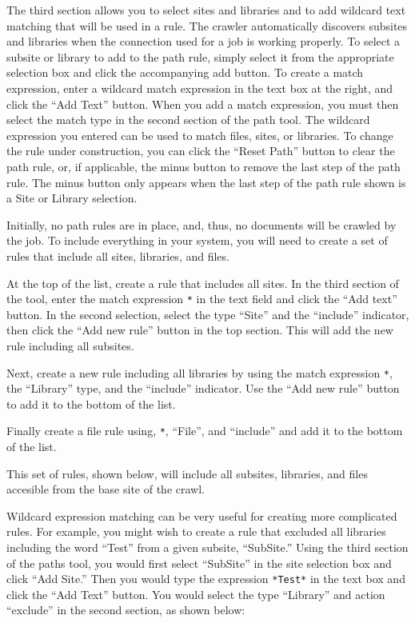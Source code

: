\begin{itemize}
The third section allows you to select sites and libraries and to add
wildcard text matching that will be used in a rule. The
crawler automatically discovers subsites and libraries when the
connection used for a job is working properly. To select a subsite or library
to add to the path rule, simply select it from the appropriate
selection box and click the accompanying add button. To create a match
expression, enter a wildcard match expression in the text box at the
right, and click the ``Add Text'' button. When you add a match
expression, you must then select the match type in the second section
of the path tool. The wildcard expression you entered can be used to
match files, sites, or libraries. To change the rule under
construction, you can click the ``Reset Path'' button to clear the
path rule, or, if applicable, the minus button to remove the last step
of the path rule. The minus button only appears when the last step of
the path rule shown is a Site or Library selection.


\end{itemize}


Initially, no path rules are in place, and, thus, no documents will be
crawled by the job. To include everything in your system, you will need to create a set of rules that include all sites, libraries, and files.

At the top of the list, create a rule that includes all sites. In the
third section of the tool, enter the match expression \texttt{*} in
the text field and click the ``Add text'' button. In the second
selection, select the type ``Site'' and the ``include'' indicator,
then click the ``Add new rule'' button in the top section. This will
add the new rule including all subsites.

Next, create a new rule including all libraries by using the match
expression \texttt{*}, the ``Library'' type, and the ``include''
indicator. Use the ``Add new rule'' button to add it to the bottom of
the list.

Finally create a file rule using, \texttt{*}, ``File'', and
``include'' and add it to the bottom of the list.

This set of rules, shown below, will include all subsites, libraries, and files
accesible from the base site of the crawl.


Wildcard expression matching can be very useful for creating more
complicated rules. For example, you might wish to create a rule that
excluded all libraries including the word ``Test'' from a
given subsite, ``SubSite.'' Using the third section of the paths
tool, you would first select ``SubSite'' in the site selection box
and click ``Add Site.'' Then you would type the expression
\texttt{*Test*} in the text box and click the ``Add Text'' button. 
You would select the type ``Library'' and action ``exclude'' in the
second section, as shown below:

